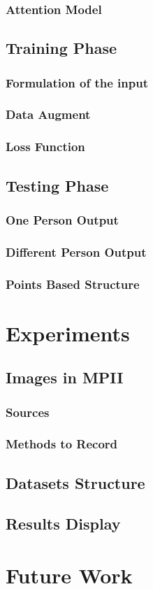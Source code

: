 \documentclass[senior]{IPSstyle}
\begin{document}
\subsection{Attention Model}

\section{Training Phase} \label{training phase}
\subsection{Formulation of the input}
\subsection{Data Augment}
\subsection{Loss Function}


\section{Testing Phase} \label{testing phase}
\subsection{One Person Output}
\subsection{Different Person Output}
\subsection{Points Based Structure}

\chapter{Experiments} \label{experiments}
\section{Images in MPII}
\subsection{Sources}
\subsection{Methods to Record}
\section{Datasets Structure}
\section{Results Display}

\chapter{Future Work}\label{future work}



\end{document}
